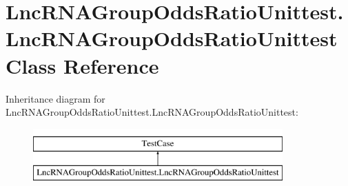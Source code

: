 \hypertarget{classLncRNAGroupOddsRatioUnittest_1_1LncRNAGroupOddsRatioUnittest}{\section{Lnc\-R\-N\-A\-Group\-Odds\-Ratio\-Unittest.\-Lnc\-R\-N\-A\-Group\-Odds\-Ratio\-Unittest Class Reference}
\label{classLncRNAGroupOddsRatioUnittest_1_1LncRNAGroupOddsRatioUnittest}
}
Inheritance diagram for Lnc\-R\-N\-A\-Group\-Odds\-Ratio\-Unittest.\-Lnc\-R\-N\-A\-Group\-Odds\-Ratio\-Unittest\-:\begin{figure}[H]
\begin{center}
\leavevmode
\includegraphics[height=2.000000cm]{classLncRNAGroupOddsRatioUnittest_1_1LncRNAGroupOddsRatioUnittest}
\end{center}
\end{figure}
